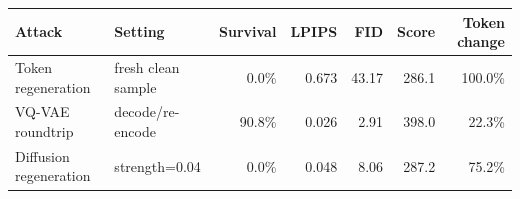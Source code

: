 \begin{tabular}{llrrrrr}
\toprule
Attack & Setting & Survival & LPIPS & FID & Score & Token change \\
\midrule
Token regeneration & fresh clean sample & 0.0\% & 0.673 & 43.17 & 286.1 & 100.0\% \\
VQ-VAE roundtrip & decode/re-encode & 90.8\% & 0.026 & 2.91 & 398.0 & 22.3\% \\
Diffusion regeneration & strength=0.04 & 0.0\% & 0.048 & 8.06 & 287.2 & 75.2\% \\
\bottomrule
\end{tabular}
